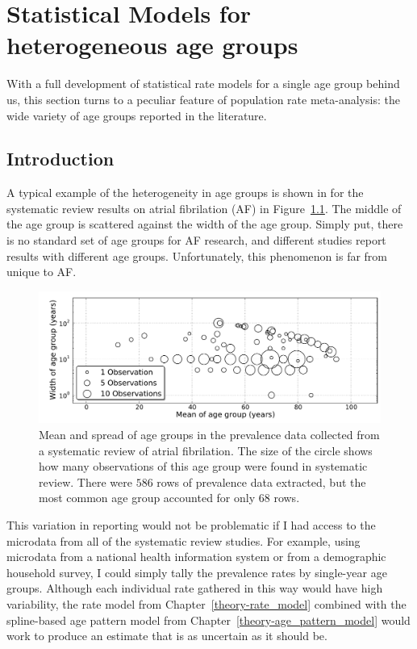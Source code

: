 \chapter{Statistical Models for heterogeneous age groups}
With a full development of statistical rate models for a single age
group behind us, this section turns to a peculiar feature of
population rate meta-analysis: the wide variety of age groups reported
in the literature.

\section{Introduction}
A typical example of the heterogeneity in age groups is shown in for
the systematic review results on atrial fibrilation (AF) in
Figure~\ref{age-group-model-af-age-groups}.  The middle of the age
group is scattered against the width of the age group.  Simply put,
there is no standard set of age groups for AF research, and different
studies report results with different age groups. Unfortunately, this
phenomenon is far from unique to AF.

\begin{figure}[h]
\begin{center}
\includegraphics[width=\textwidth]{af_age_groups_scatter.pdf}
\end{center}
\caption{Mean and spread of age groups in the prevalence data
  collected from a systematic review of atrial fibrilation. The
  size of the circle shows how many observations of this age group
  were found in systematic review. There were
  $586$ rows of prevalence data
  extracted, but the most common age group accounted for only
  $68$ rows.}
\label{age-group-model-af-age-groups}
\end{figure}

This variation in reporting would not be problematic if I had access
to the microdata from all of the systematic review studies.  For
example, using microdata from a national health information system or
from a demographic household survey, I could simply tally the
prevalence rates by single-year age groups.  Although each individual
rate gathered in this way would have high variability, the rate model
from Chapter~\ref{theory-rate_model} combined with the spline-based
age pattern model from Chapter~\ref{theory-age_pattern_model} would
work to produce an estimate that is as uncertain as it should be.

